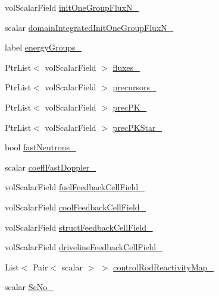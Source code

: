 \begin{DoxyCompactItemize}
\item 
vol\+Scalar\+Field \hyperlink{classFoam_1_1pointKineticNeutronics_a0f080aa1d645794be2c5d995e5c8b693}{init\+One\+Group\+Flux\+N\+\_\+}
\item 
scalar \hyperlink{classFoam_1_1pointKineticNeutronics_a593e908fc48d52d05ca5c73ec620a245}{domain\+Integrated\+Init\+One\+Group\+Flux\+N\+\_\+}
\item 
label \hyperlink{classFoam_1_1pointKineticNeutronics_a455b047ba459073908c08fd5e087dc45}{energy\+Groups\+\_\+}
\item 
Ptr\+List$<$ vol\+Scalar\+Field $>$ \hyperlink{classFoam_1_1pointKineticNeutronics_a859ec415e376c0be003e4ed2260d1f83}{fluxes\+\_\+}
\item 
Ptr\+List$<$ vol\+Scalar\+Field $>$ \hyperlink{classFoam_1_1pointKineticNeutronics_a5bf6b4f82597921a8dc3940af6bdecbd}{precursors\+\_\+}
\item 
Ptr\+List$<$ vol\+Scalar\+Field $>$ \hyperlink{classFoam_1_1pointKineticNeutronics_a805a44fcb538e6b4cf0c730b45eeed4e}{prec\+P\+K\+\_\+}
\item 
Ptr\+List$<$ vol\+Scalar\+Field $>$ \hyperlink{classFoam_1_1pointKineticNeutronics_ad13b6daf80e8e59a6802038103667555}{prec\+P\+K\+Star\+\_\+}
\item 
bool \hyperlink{classFoam_1_1pointKineticNeutronics_ad36ef1463ce7c1bf8b5b083ad229af93}{fast\+Neutrons\+\_\+}
\item 
scalar \hyperlink{classFoam_1_1pointKineticNeutronics_a2d01abd81fc3dbc94a752b830da0d1c3}{coeff\+Fast\+Doppler\+\_\+}
\item 
vol\+Scalar\+Field \hyperlink{classFoam_1_1pointKineticNeutronics_a41bdc30b1313a071bfd6bc3f2d44d757}{fuel\+Feedback\+Cell\+Field\+\_\+}
\item 
vol\+Scalar\+Field \hyperlink{classFoam_1_1pointKineticNeutronics_ac637c9c0afab11f280c96cc6a0e7441e}{cool\+Feedback\+Cell\+Field\+\_\+}
\item 
vol\+Scalar\+Field \hyperlink{classFoam_1_1pointKineticNeutronics_af5543e61067b56e032049668096eccf9}{struct\+Feedback\+Cell\+Field\+\_\+}
\item 
vol\+Scalar\+Field \hyperlink{classFoam_1_1pointKineticNeutronics_ad4de3b26bdd709fe27bba71697cc6875}{driveline\+Feedback\+Cell\+Field\+\_\+}
\item 
List$<$ Pair$<$ scalar $>$ $>$ \hyperlink{classFoam_1_1pointKineticNeutronics_a5e58eda09ad5d9b610e0585783cc8a7b}{control\+Rod\+Reactivity\+Map\+\_\+}
\item 
scalar \hyperlink{classFoam_1_1pointKineticNeutronics_a4c4a4ba88fdfadec3edee27595650f75}{Sc\+No\+\_\+}

\end{DoxyCompactItemize}
